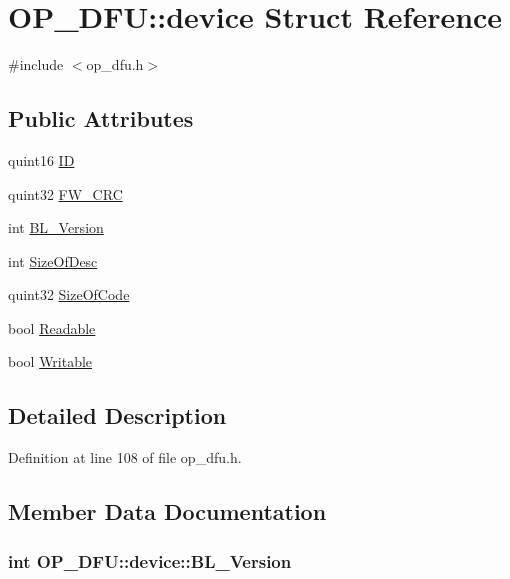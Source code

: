 \hypertarget{struct_o_p___d_f_u_1_1device}{\section{\-O\-P\-\_\-\-D\-F\-U\-:\-:device \-Struct \-Reference}
\label{struct_o_p___d_f_u_1_1device}
}


{\ttfamily \#include $<$op\-\_\-dfu.\-h$>$}

\subsection*{\-Public \-Attributes}
\begin{DoxyCompactItemize}
\item 
quint16 \hyperlink{struct_o_p___d_f_u_1_1device_afb3f2517289d989e75630f33abbc4685}{\-I\-D}
\item 
quint32 \hyperlink{struct_o_p___d_f_u_1_1device_a9f0dfb2fe44c04290c45c907ef33b21d}{\-F\-W\-\_\-\-C\-R\-C}
\item 
int \hyperlink{struct_o_p___d_f_u_1_1device_ab89763014053b2de992a088ea6699c7e}{\-B\-L\-\_\-\-Version}
\item 
int \hyperlink{struct_o_p___d_f_u_1_1device_af5032c18eb9777d1537ae89d28426567}{\-Size\-Of\-Desc}
\item 
quint32 \hyperlink{struct_o_p___d_f_u_1_1device_a02ce2352ca3f52e77ef7073f1fd0afeb}{\-Size\-Of\-Code}
\item 
bool \hyperlink{struct_o_p___d_f_u_1_1device_a0640f3f5608690d8bb93087ba8c15e86}{\-Readable}
\item 
bool \hyperlink{struct_o_p___d_f_u_1_1device_adf6e576700c6b3bb81fab16a4627d476}{\-Writable}
\end{DoxyCompactItemize}


\subsection{\-Detailed \-Description}


\-Definition at line 108 of file op\-\_\-dfu.\-h.



\subsection{\-Member \-Data \-Documentation}
\hypertarget{struct_o_p___d_f_u_1_1device_ab89763014053b2de992a088ea6699c7e}{
\subsubsection[{\-B\-L\-\_\-\-Version}]{\setlength{\rightskip}{0pt plus 5cm}int {\bf \-O\-P\-\_\-\-D\-F\-U\-::device\-::\-B\-L\-\_\-\-Version}}}\label{struct_o_p___d_f_u_1_1device_ab89763014053b2de992a088ea6699c7e}


